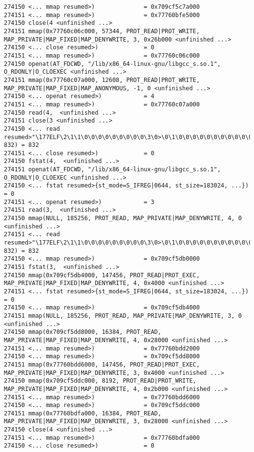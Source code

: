 \begin{verbatim}
274150 <... mmap resumed>)              = 0x709cf5c7a000
274151 <... mmap resumed>)              = 0x77760bfe5000
274150 close(4 <unfinished ...>
274151 mmap(0x77760c06c000, 57344, PROT_READ|PROT_WRITE, MAP_PRIVATE|MAP_FIXED|MAP_DENYWRITE, 3, 0x26b000 <unfinished ...>
274150 <... close resumed>)             = 0
274151 <... mmap resumed>)              = 0x77760c06c000
274150 openat(AT_FDCWD, "/lib/x86_64-linux-gnu/libgcc_s.so.1", O_RDONLY|O_CLOEXEC <unfinished ...>
274151 mmap(0x77760c07a000, 12608, PROT_READ|PROT_WRITE, MAP_PRIVATE|MAP_FIXED|MAP_ANONYMOUS, -1, 0 <unfinished ...>
274150 <... openat resumed>)            = 4
274151 <... mmap resumed>)              = 0x77760c07a000
274150 read(4,  <unfinished ...>
274151 close(3 <unfinished ...>
274150 <... read resumed>"\177ELF\2\1\1\0\0\0\0\0\0\0\0\0\3\0>\0\1\0\0\0\0\0\0\0\0\0\0\0"..., 832) = 832
274151 <... close resumed>)             = 0
274150 fstat(4,  <unfinished ...>
274151 openat(AT_FDCWD, "/lib/x86_64-linux-gnu/libgcc_s.so.1", O_RDONLY|O_CLOEXEC <unfinished ...>
274150 <... fstat resumed>{st_mode=S_IFREG|0644, st_size=183024, ...}) = 0
274151 <... openat resumed>)            = 3
274151 read(3,  <unfinished ...>
274150 mmap(NULL, 185256, PROT_READ, MAP_PRIVATE|MAP_DENYWRITE, 4, 0 <unfinished ...>
274151 <... read resumed>"\177ELF\2\1\1\0\0\0\0\0\0\0\0\0\3\0>\0\1\0\0\0\0\0\0\0\0\0\0\0"..., 832) = 832
274150 <... mmap resumed>)              = 0x709cf5db0000
274151 fstat(3,  <unfinished ...>
274150 mmap(0x709cf5db4000, 147456, PROT_READ|PROT_EXEC, MAP_PRIVATE|MAP_FIXED|MAP_DENYWRITE, 4, 0x4000 <unfinished ...>
274151 <... fstat resumed>{st_mode=S_IFREG|0644, st_size=183024, ...}) = 0
274150 <... mmap resumed>)              = 0x709cf5db4000
274151 mmap(NULL, 185256, PROT_READ, MAP_PRIVATE|MAP_DENYWRITE, 3, 0 <unfinished ...>
274150 mmap(0x709cf5dd8000, 16384, PROT_READ, MAP_PRIVATE|MAP_FIXED|MAP_DENYWRITE, 4, 0x28000 <unfinished ...>
274151 <... mmap resumed>)              = 0x77760bdd2000
274150 <... mmap resumed>)              = 0x709cf5dd8000
274151 mmap(0x77760bdd6000, 147456, PROT_READ|PROT_EXEC, MAP_PRIVATE|MAP_FIXED|MAP_DENYWRITE, 3, 0x4000 <unfinished ...>
274150 mmap(0x709cf5ddc000, 8192, PROT_READ|PROT_WRITE, MAP_PRIVATE|MAP_FIXED|MAP_DENYWRITE, 4, 0x2b000 <unfinished ...>
274151 <... mmap resumed>)              = 0x77760bdd6000
274150 <... mmap resumed>)              = 0x709cf5ddc000
274151 mmap(0x77760bdfa000, 16384, PROT_READ, MAP_PRIVATE|MAP_FIXED|MAP_DENYWRITE, 3, 0x28000 <unfinished ...>
274150 close(4 <unfinished ...>
274151 <... mmap resumed>)              = 0x77760bdfa000
274150 <... close resumed>)             = 0

\end{verbatim}
